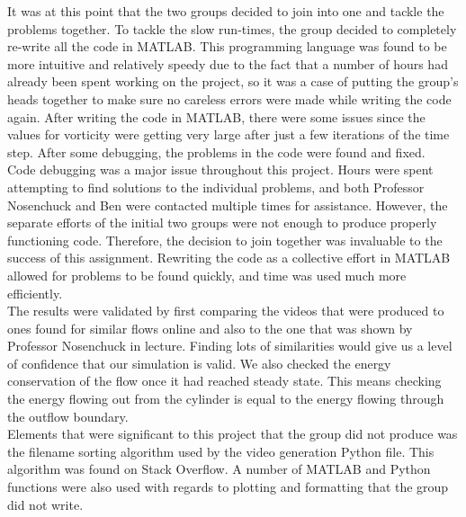 It was at this point that the two groups decided to join into one and tackle the problems together. To tackle the slow run-times, the group decided to completely re-write all the code in MATLAB. This programming language was found to be more intuitive and relatively speedy due to the fact that a number of hours had already been spent working on the project, so it was a case of putting the group's heads together to make sure no careless errors were made while writing the code again. After writing the code in MATLAB, there were some issues since the values for vorticity were getting very large after just a few iterations of the time step. After some debugging, the problems in the code were found and fixed. \\

Code debugging was a major issue throughout this project. Hours were spent attempting to find solutions to the individual problems, and both Professor Nosenchuck and Ben were contacted multiple times for assistance.  However, the separate efforts of the initial two groups were not enough to produce properly functioning code.  Therefore, the decision to join together was invaluable to the success of this assignment.  Rewriting the code as a collective effort in MATLAB allowed for problems to be found quickly, and time was used much more efficiently. \\

The results were validated by first comparing the videos that were produced to ones found for similar flows online and also to the one that was shown  by Professor Nosenchuck in lecture. Finding lots of similarities would give us a level of confidence that our simulation is valid. We also checked the energy conservation of the flow once it had reached steady state. This means checking the energy flowing out from the cylinder is equal to the energy flowing through the outflow boundary. \\

Elements that were significant to this project that the group did not produce was the filename sorting algorithm used by the video generation Python file. This algorithm was found on Stack Overflow. A number of MATLAB and Python functions were also used with regards to plotting and formatting that the group did not write. \\






\clearpage











